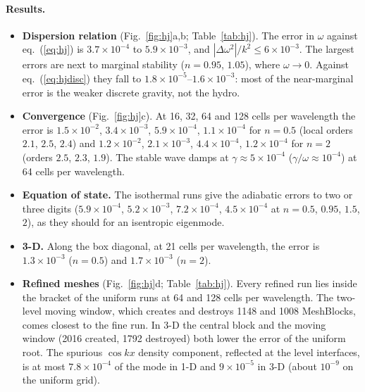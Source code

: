 \documentclass[11pt]{article}
\begin{document}
\paragraph{Results.}
\begin{itemize}\itemsep2pt
\item \textbf{Dispersion relation} (Fig.~\ref{fig:hj}a,b; Table~\ref{tab:hj}). The error in
      $\omega$ against eq.~(\ref{eq:hj}) is $3.7\times10^{-4}$ to $5.9\times10^{-3}$, and
      $|\Delta\omega^2|/k^2 \le 6\times10^{-3}$. The largest errors are next to marginal
      stability ($n = 0.95$, $1.05$), where $\omega \to 0$. Against eq.~(\ref{eq:hjdisc}) they
      fall to $1.8\times10^{-5}$--$1.6\times10^{-3}$: most of the near-marginal error is the
      weaker discrete gravity, not the hydro.
\item \textbf{Convergence} (Fig.~\ref{fig:hj}c). At 16, 32, 64 and 128 cells per wavelength the
      error is $1.5\times10^{-2}$, $3.4\times10^{-3}$, $5.9\times10^{-4}$, $1.1\times10^{-4}$
      for $n = 0.5$ (local orders $2.1$, $2.5$, $2.4$) and $1.2\times10^{-2}$,
      $2.1\times10^{-3}$, $4.4\times10^{-4}$, $1.2\times10^{-4}$ for $n = 2$ (orders $2.5$,
      $2.3$, $1.9$). The stable wave damps at $\gamma \approx 5\times10^{-4}$
      ($\gamma/\omega \approx 10^{-4}$) at 64 cells per wavelength.
\item \textbf{Equation of state.} The isothermal runs give the adiabatic errors to two or three
      digits ($5.9\times10^{-4}$, $5.2\times10^{-3}$, $7.2\times10^{-4}$, $4.5\times10^{-4}$
      at $n = 0.5$, $0.95$, $1.5$, $2$), as they should for an isentropic eigenmode.
\item \textbf{3-D.} Along the box diagonal, at 21 cells per wavelength, the error is
      $1.3\times10^{-3}$ ($n = 0.5$) and $1.7\times10^{-3}$ ($n = 2$).
\item \textbf{Refined meshes} (Fig.~\ref{fig:hj}d; Table~\ref{tab:hj}). Every refined run lies
      inside the bracket of the uniform runs at 64 and 128 cells per wavelength. The
      two-level moving window, which creates and destroys 1148 and 1008 MeshBlocks, comes
      closest to the fine run. In 3-D the central block and the moving window (2016 created,
      1792 destroyed) both lower the error of the uniform root. The spurious $\cos kx$ density
      component, reflected at the level interfaces, is at most $7.8\times10^{-4}$ of the mode
      in 1-D and $9\times10^{-5}$ in 3-D (about $10^{-9}$ on the uniform grid).
\end{itemize}
\end{document}
